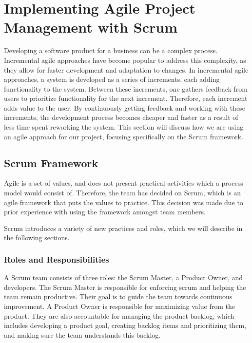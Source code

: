 \section{Implementing Agile Project Management with Scrum}
Developing a software product for a business can be a complex process.
Incremental agile approaches have become popular to address this complexity, as they allow for faster development and adaptation to changes.\cite{sommervilleSoftwareEngineering2016}
In incremental agile approaches, a system is developed as a series of increments, each adding functionality to the system.
Between these increments, one gathers feedback from users to prioritize functionality for the next increment.
Therefore, each increment adds value to the user.
By continuously getting feedback and working with these increments, the development process becomes cheaper and faster as a result of less time spent reworking the system.\cite{sommervilleSoftwareEngineering2016}
This section will discuss how we are using an agile approach for our project, focusing specifically on the Scrum framework.

\subsection*{Scrum Framework}
Agile is a set of values, and does not present practical activities which a process model would consist of\cite{sutherlandScrumArtDoing2014}.
Therefore, the team has decided on Scrum\cite{scrumdotorg}, which is an agile framework that puts the values to practice.
This decision was made due to prior experience with using the framework amongst team members.

Scrum introduces a variety of new practices and roles, which we will describe in the following sections.

\subsubsection*{Roles and Responsibilities}
A Scrum team consists of three roles: the Scrum Master, a Product Owner, and developers.
The Scrum Master is responsible for enforcing scrum and helping the team remain productive.
Their goal is to guide the team towards continuous improvement.
A Product Owner is responsible for maximizing value from the product.
They are also accountable for managing the product backlog, which includes developing a product goal, creating backlog items and prioritizing them, and making sure the team understands this backlog.\cite{scrumdotorg}

